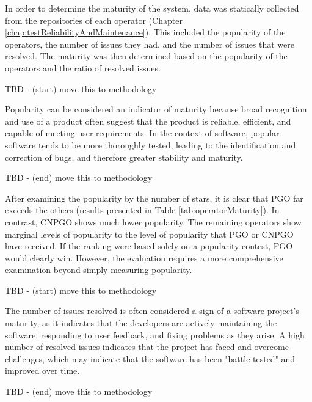 
In order to determine the maturity of the system, data was statically collected from the repositories of each operator (Chapter \ref{chap:testReliabilityAndMaintenance}).
This included the popularity of the operators, the number of issues they had, and the number of issues that were resolved.
The maturity was then determined based on the popularity of the operators and the ratio of resolved issues.

TBD - (start) move this to methodology

Popularity can be considered an indicator of maturity because broad recognition and use of a product often suggest that the product is reliable, efficient, and capable of meeting user requirements. In the context of software, popular software tends to be more thoroughly tested, leading to the identification and correction of bugs, and therefore greater stability and maturity.

TBD - (end) move this to methodology

After examining the popularity by the number of stars, it is clear that PGO far exceeds the others (results presented in Table \ref{tab:operatorMaturity}). In contrast, CNPGO shows much lower popularity.
The remaining operators show marginal levels of popularity to the level of popularity that PGO or CNPGO have received.
If the ranking were based solely on a popularity contest, PGO would clearly win. However, the evaluation requires a more comprehensive examination beyond simply measuring popularity.

TBD - (start) move this to methodology

The number of issues resolved is often considered a sign of a software project's maturity, as it indicates that the developers are actively maintaining the software, responding to user feedback, and fixing problems as they arise. A high number of resolved issues indicates that the project has faced and overcome challenges, which may indicate that the software has been "battle tested" and improved over time.

TBD - (end) move this to methodology

